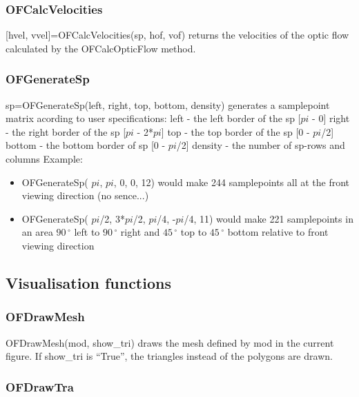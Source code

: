 \documentclass[a4paper]{article}
\begin{document}
\subsubsection{OFCalcVelocities}

[hvel, vvel]=OFCalcVelocities(sp, hof, vof) returns the velocities of the optic flow calculated by the OFCalcOpticFlow method.

\subsubsection{OFGenerateSp}
sp=OFGenerateSp(left, right, top, bottom, density) generates a samplepoint matrix acording to user specifications:\newline
left - the left border of the sp [$pi$ - 0]\newline
right - the right border of the sp [$pi$ - 2*$pi$]\newline
top - the top border of the sp [0 - $pi$/2]\newline
bottom - the bottom border of sp [0 - $pi$/2]\newline
density - the number of sp-rows and columns\newline
Example:
\begin{itemize}
\item OFGenerateSp( $pi$, $pi$, 0, 0, 12) would make 244 samplepoints all at
the front viewing direction (no sence...)

\item OFGenerateSp( $pi$/2, 3*$pi$/2, $pi$/4, -$pi$/4, 11) would make 221 samplepoints
in an area $90\,^{\circ}$ left to $90\,^{\circ}$ right and $45\,^{\circ}$ top to $45\,^{\circ}$ bottom relative to
front viewing direction

\end{itemize}

\subsection{Visualisation functions}

\subsubsection{OFDrawMesh}

OFDrawMesh(mod, show\_tri) draws the mesh defined by mod in the current
figure. If show\_tri is ``True'', the triangles instead of the polygons
are drawn.

\subsubsection{OFDrawTra}
\end{document}
